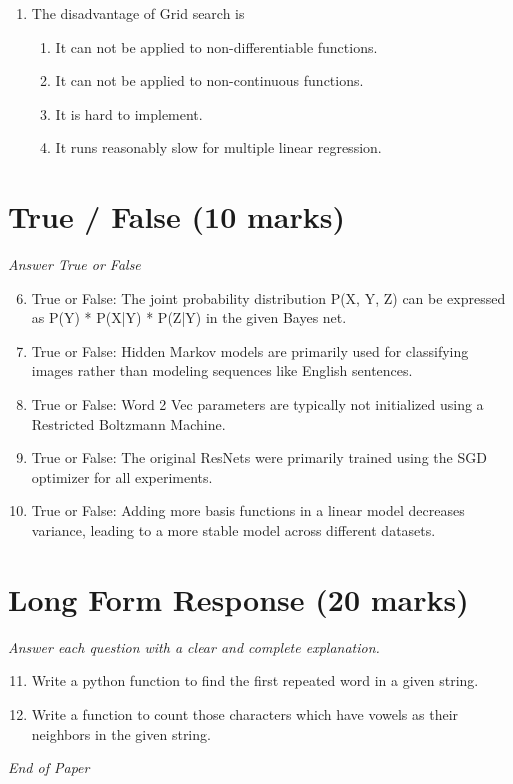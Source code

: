 \documentclass[12pt]{article}
\begin{document}
\begin{enumerate}[label=\arabic*.]
\begin{enumerate}[label=(\alph*)]
    \item Whether we learn the weights by matrix inversion or gradient descent
    \item The assumed variance of the Gaussian noise
    \item The use of a constant-term unit input
\end{enumerate}
\item The disadvantage of Grid search is
\begin{enumerate}[label=(\alph*)]
    \item It can not be applied to non-differentiable functions.
    \item It can not be applied to non-continuous functions.
    \item It is hard to implement.
    \item It runs reasonably slow for multiple linear regression.
\end{enumerate}
\end{enumerate}

\section*{True / False (10 marks)}
\textit{Answer True or False}
\begin{enumerate}[label=\arabic*.]
\setcounter{enumi}{5}
\item True or False: The joint probability distribution P(X, Y, Z) can be expressed as P(Y) * P(X|Y) * P(Z|Y) in the given Bayes net.
\item True or False: Hidden Markov models are primarily used for classifying images rather than modeling sequences like English sentences.
\item True or False: Word 2 Vec parameters are typically not initialized using a Restricted Boltzmann Machine.
\item True or False: The original ResNets were primarily trained using the SGD optimizer for all experiments.
\item True or False: Adding more basis functions in a linear model decreases variance, leading to a more stable model across different datasets.
\end{enumerate}

\section*{Long Form Response (20 marks)}
\textit{Answer each question with a clear and complete explanation.}
\begin{enumerate}[label=\arabic*.]
\setcounter{enumi}{10}
\item Write a python function to find the first repeated word in a given string.
\item Write a function to count those characters which have vowels as their neighbors in the given string.
\end{enumerate}

\vfill
\noindent\textit{End of Paper}
\end{document}
